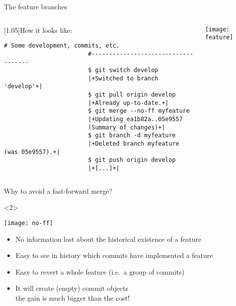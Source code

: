 \documentclass[usenames,svgnames,14pt]{beamer}
\renewcommand{\checkmark}[1][PP]{\textcolor{#1}{\ding{51}}}
\newcommand{\crossmark}[1][PT]{\textcolor{#1}{\ding{55}}}
\newcommand{\then}{\raisebox{2pt}{$\;\drsh\;$}}
\begin{document}
\begin{frame}[fragile,c]{The feature branches}
\begin{columns}[c]
\begin{column}{0.65\textwidth}
\begin{overlayarea}{\textwidth}{0.75\textheight}
\begin{varblock}{}[1.05\textwidth]{How it looks like:}
\begin{lstlisting}[style=MyBash]
                        # Some development, commits, etc.
                        #------------------------------------
                        $ git switch develop
                        |+Switched to branch 'develop'+|
                        $ git pull origin develop
                        |+Already up-to-date.+|
                        $ git merge --no-ff myfeature
                        |+Updating ea1b82a..05e9557
                        (Summary of changes)+|
                        $ git branch -d myfeature
                        |+Deleted branch myfeature (was 05e9557).+|
                        $ git push origin develop
                        |+[...]+|
                    \end{lstlisting}
                \end{varblock}
            \end{overlayarea}
        \end{column}
        \begin{column}{0.3\textwidth}
            \centerline{\texttt{[image: feature]}}
        \end{column}
    \end{columns}
\end{frame}
\begin{frame}[c]{Why to avoid a fast-forward merge?}
    \begin{onlyenv}<2>
        \vspace{-8mm}
        \begin{center}
            \texttt{[image: no-ff]}
        \end{center}
        \setlength{\leftmargini}{7mm}
        \begin{itemize}
            \setlength{\itemsep}{2mm}
            \item[\checkmark] No information lost about the historical existence of a feature
            \item[\checkmark] Easy to see in history which commits have implemented a feature
            \item[\checkmark] Easy to revert a whole feature (i.e.\ a group of commits)
            \item[\crossmark] It will create (empty) commit objects\\
                              \then the gain is much bigger than the cost!
        \end{itemize}
    \end{onlyenv}
\end{frame}
\end{document}
